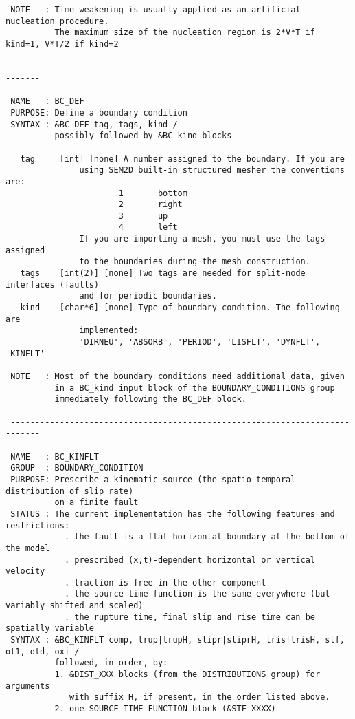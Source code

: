 \begin{verbatim}
 NOTE   : Time-weakening is usually applied as an artificial nucleation procedure.
          The maximum size of the nucleation region is 2*V*T if kind=1, V*T/2 if kind=2

 ----------------------------------------------------------------------------

 NAME   : BC_DEF
 PURPOSE: Define a boundary condition
 SYNTAX : &BC_DEF tag, tags, kind /
          possibly followed by &BC_kind blocks 

   tag     [int] [none] A number assigned to the boundary. If you are
               using SEM2D built-in structured mesher the conventions are:
                       1       bottom
                       2       right
                       3       up
                       4       left
               If you are importing a mesh, you must use the tags assigned
               to the boundaries during the mesh construction.
   tags    [int(2)] [none] Two tags are needed for split-node interfaces (faults)
               and for periodic boundaries.
   kind    [char*6] [none] Type of boundary condition. The following are
               implemented:
               'DIRNEU', 'ABSORB', 'PERIOD', 'LISFLT', 'DYNFLT', 'KINFLT'

 NOTE   : Most of the boundary conditions need additional data, given
          in a BC_kind input block of the BOUNDARY_CONDITIONS group
          immediately following the BC_DEF block.

 ----------------------------------------------------------------------------

 NAME   : BC_KINFLT
 GROUP  : BOUNDARY_CONDITION
 PURPOSE: Prescribe a kinematic source (the spatio-temporal distribution of slip rate)
          on a finite fault
 STATUS : The current implementation has the following features and restrictions:
            . the fault is a flat horizontal boundary at the bottom of the model
            . prescribed (x,t)-dependent horizontal or vertical velocity
            . traction is free in the other component 
            . the source time function is the same everywhere (but variably shifted and scaled)
            . the rupture time, final slip and rise time can be spatially variable
 SYNTAX : &BC_KINFLT comp, trup|trupH, slipr|sliprH, tris|trisH, stf, ot1, otd, oxi /
          followed, in order, by:
          1. &DIST_XXX blocks (from the DISTRIBUTIONS group) for arguments
             with suffix H, if present, in the order listed above.
          2. one SOURCE TIME FUNCTION block (&STF_XXXX)
 

\end{verbatim}
